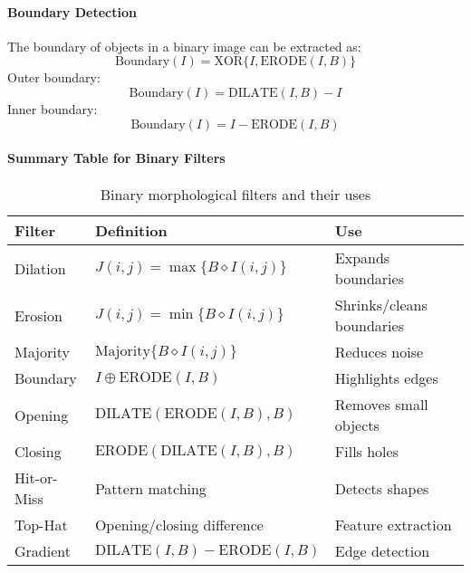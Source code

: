 \paragraph{Boundary Detection}

The boundary of objects in a binary image can be extracted as:
$$
\text{Boundary}(I) = \text{XOR}\{I, \text{ERODE}(I,B)\}
$$
Outer boundary:
\[
\text{Boundary}(I) = \text{DILATE}(I,B) - I
\]
Inner boundary:
\[
\text{Boundary}(I) = I - \text{ERODE}(I,B)
\]



\paragraph{Summary Table for Binary Filters}

\begin{table}[H]
\centering
\begin{tabular}{|l|l|l|}
\hline
\textbf{Filter} & \textbf{Definition} & \textbf{Use} \\
\hline
Dilation & $J(i,j) = \max \{ B \diamond I(i,j) \}$ & Expands boundaries \\
Erosion & $J(i,j) = \min \{ B \diamond I(i,j) \}$ & Shrinks/cleans boundaries \\
Majority & $\text{Majority}\{ B \diamond I(i,j) \}$ & Reduces noise \\
Boundary & $I \oplus \text{ERODE}(I,B)$ & Highlights edges \\
Opening & $\text{DILATE}(\text{ERODE}(I,B),B)$ & Removes small objects \\
Closing & $\text{ERODE}(\text{DILATE}(I,B),B)$ & Fills holes \\
Hit-or-Miss & Pattern matching & Detects shapes \\
Top-Hat & Opening/closing difference & Feature extraction \\
Gradient & $\text{DILATE}(I,B) - \text{ERODE}(I,B)$ & Edge detection \\
\hline
\end{tabular}
\caption{Binary morphological filters and their uses}
\end{table}
